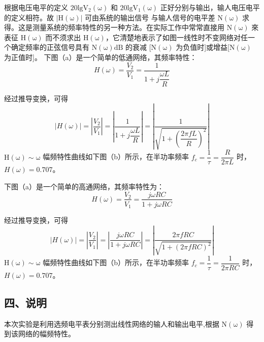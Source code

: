 \documentclass[dvipsnames, svgnames,a4paper,11pt]{article}
\begin{document}
根据电压电平的定义 $\mathrm{20lgV_2(\omega)}$ 和 $\mathrm{20lgV_1(\omega)}$ 正好分别与输出，输人电压电平的定义相符。故 $\mathrm{|H(\omega)|}$ 可由系统的输出信号 与输人信号的电平差 $\mathrm{N(\omega)}$ 求得。这是测量系统的频率特性的另一种方法。在实际工作中常常直接用 $\mathrm{N(\omega)}$ 來表征 $\mathrm{H(\omega)}$ 而不须求出 $\mathrm{H(\omega)}$，它清楚地表示了如图一线性时不变网络对任一个确定频率的正弦信号具有 $\mathrm{N(\omega)dB}$ 的衰减 [$\mathrm{N(\omega)}$ 为负值时]或增益[$\mathrm{N(\omega)}$ 为正值时]。
下图（a）是一个简单的低通网络，其频率特性：
\begin{equation}
  H(\omega) = \dfrac{V_2}{V_1} = \dfrac{1}{1 + j\dfrac{\omega L}{R}}
\end{equation}

经过推导变换，可得
\begin{equation}
  \left |H(\omega) \right | = \left |\dfrac{V_2}{V_1} \right | = \left |\dfrac{1}{1 + j\dfrac{\omega L}{R}}\right | = \left | \dfrac{1}{\sqrt{1 + (\dfrac{2\pi fL}{R})^2}} \right |
\end{equation}
$\mathrm{H(\omega) \sim \omega}$ 幅频特性曲线如下图（b）所示，在半功率频率 $f_c = \dfrac{1}{\tau} = \dfrac{R}{2\pi L}$ 时，$H(\omega) = 0.707$。

下图（a）是一个简单的高通网络，其频率特性为：
\begin{equation}
  H(\omega) = \dfrac{V_2}{V_1} = \dfrac{j\omega RC}{1 + j\omega RC}
\end{equation}

经过推导变换，可得
\begin{equation}
  \left |H(\omega) \right | = \left |\dfrac{V_2}{V_1} \right | = \left |\dfrac{j\omega RC}{1 + j\omega RC}\right | = \left | \dfrac{2\pi fRC}{\sqrt{1 + (2\pi fRC)^2}} \right |
\end{equation}
$\mathrm{H(\omega) \sim \omega}$ 幅频特性曲线如下图（b）所示，在半功率频率 $f_c = \dfrac{1}{\tau} = \dfrac{1}{2\pi RC}$ 时，$H(\omega) = 0.707$。

\begin{figure}[htbp]
	\centering
	\caption{}
\end{figure}

\subsection*{四、说明}
本次实验是利用选频电平表分别测出线性网络的输人和输出电平,根据 $\mathrm{N(\omega)}$ 得到该网络的幅频特性。
\end{document}
